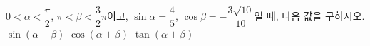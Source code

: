$0<\alpha<\dfrac{\pi}{2}$, $\pi<\beta<\dfrac{3}{2}\pi$이고, $\sin\alpha=\dfrac{4}{5}$, $\cos\beta=-\dfrac{3\sqrt{10}}{10}$일 때, 다음 값을 구하시오.
 $\sin(\alpha-\beta)$
 $\cos(\alpha+\beta)$
 $\tan(\alpha+\beta)$
